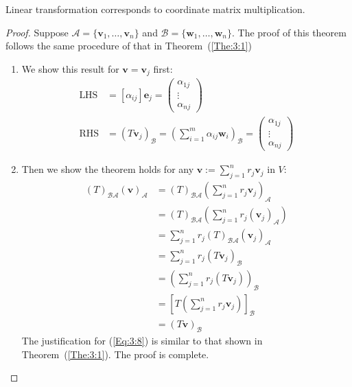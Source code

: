 \begin{remark}
Linear transformation corresponds to coordinate matrix multiplication.
\end{remark}

\begin{proof}
Suppose $\mathcal{A}=\{\bm v_1,\dots,\bm v_n\}$ and $\mathcal{B}=\{\bm w_1,\dots,\bm w_n\}$.  The proof of this theorem follows the same procedure of that in Theorem~(\ref{The:3:1})
\begin{enumerate}
\item
We show this result for $\bm v=\bm v_j$ first:
\begin{align*}
\text{LHS}&=[\alpha_{ij}]\bm e_j=
\begin{pmatrix}
\alpha_{1j}\\\vdots\\\alpha_{nj}
\end{pmatrix}
\\
\text{RHS}&=(T\bm v_j)_{\mathcal{B}}
=
\left(
\sum_{i=1}^m\alpha_{ij}\bm w_i
\right)_{\mathcal{B}}
=
\begin{pmatrix}
\alpha_{1j}\\\vdots\\\alpha_{nj}
\end{pmatrix}
\end{align*}
\item
Then we show the theorem holds for any $\bm v:=\sum_{j=1}^nr_j\bm v_j$ in $V$:
\begin{subequations}
\begin{align}\label{Eq:3:8}
(T)_{\mathcal{B}\mathcal{A}}(\bm v)_{\mathcal{A}}
&=
(T)_{\mathcal{B}\mathcal{A}}
\left(
\sum_{j=1}^nr_j\bm v_j
\right)_{\mathcal{A}}\\
&=
(T)_{\mathcal{B}\mathcal{A}}
\left(
\sum_{j=1}^nr_j(\bm v_j)_{\mathcal{A}}
\right)\\
&=
\sum_{j=1}^nr_j(T)_{\mathcal{B}\mathcal{A}}(\bm v_j)_{\mathcal{A}}\\
&=
\sum_{j=1}^nr_j(T\bm v_j)_{\mathcal{B}}\\
&=
\left(
\sum_{j=1}^nr_j(T\bm v_j)
\right)_{\mathcal{B}}\\
&=
\left[
T
(
\sum_{j=1}^nr_j\bm v_j
)
\right]_{\mathcal{B}}\\
&=(T\bm v)_{\mathcal{B}}
\end{align}
\end{subequations}
The justification for (\ref{Eq:3:8}) is similar to that shown in Theorem~(\ref{The:3:1}). The proof is complete.
\end{enumerate}





\end{proof}

